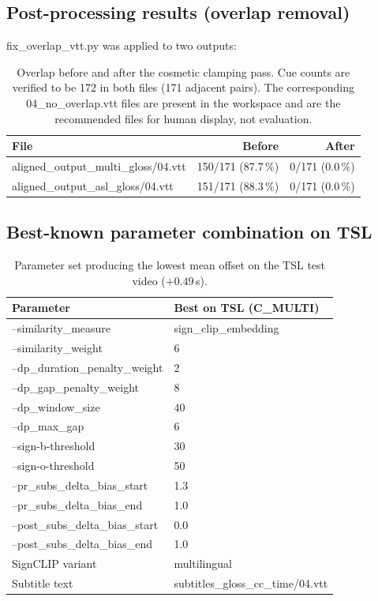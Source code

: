 \documentclass[11pt,a4paper]{article}
\def\texttt#1{#1}%
\def\textbf#1{#1}%
\begin{document}
\subsection{Post-processing results (overlap removal)}
\texttt{fix\_overlap\_vtt.py} was applied to two outputs:
\begin{table}[h]
\centering
\small
\begin{tabular}{lrr}
\toprule
\textbf{File} & \textbf{Before} & \textbf{After} \\
\midrule
\texttt{aligned\_output\_multi\_gloss/04.vtt}      & 150/171 (87.7\,\%) & \textbf{0/171 (0.0\,\%)} \\
\texttt{aligned\_output\_asl\_gloss/04.vtt}        & 151/171 (88.3\,\%) & \textbf{0/171 (0.0\,\%)} \\
\bottomrule
\end{tabular}
\caption{Overlap before and after the cosmetic clamping pass. Cue counts are
verified to be 172 in both files (171 adjacent pairs). The corresponding
\texttt{04\_no\_overlap.vtt} files are present in the workspace and are the
recommended files for human display, not evaluation.}
\label{tab:overlap-postproc}
\end{table}

\subsection{Best-known parameter combination on TSL}
\begin{table}[h]
\centering
\small
\begin{tabularx}{\linewidth}{lX}
\toprule
\textbf{Parameter} & \textbf{Best on TSL (C\_MULTI)} \\
\midrule
\texttt{--similarity\_measure}              & \texttt{sign\_clip\_embedding} \\
\texttt{--similarity\_weight}               & 6 \\
\texttt{--dp\_duration\_penalty\_weight}    & 2 \\
\texttt{--dp\_gap\_penalty\_weight}         & 8 \\
\texttt{--dp\_window\_size}                 & 40 \\
\texttt{--dp\_max\_gap}                     & 6 \\
\texttt{--sign-b-threshold}                 & 30 \\
\texttt{--sign-o-threshold}                 & 50 \\
\texttt{--pr\_subs\_delta\_bias\_start}     & 1.3 \\
\texttt{--pr\_subs\_delta\_bias\_end}       & 1.0 \\
\texttt{--post\_subs\_delta\_bias\_start}   & 0.0 \\
\texttt{--post\_subs\_delta\_bias\_end}     & 1.0 \\
SignCLIP variant                            & \texttt{multilingual} \\
Subtitle text                               & \texttt{subtitles\_gloss\_cc\_time/04.vtt} \\
\bottomrule
\end{tabularx}
\caption{Parameter set producing the lowest mean offset on the TSL test video
($+0.49$\,s).}
\label{tab:best-params}
\end{table}
\end{document}
